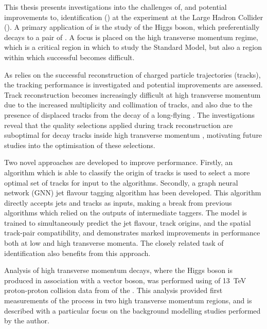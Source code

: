 
This thesis presents investigations into the challenges of, and potential improvements to, \bjet identification (\btagging) at the \ATLAS experiment at the Large Hadron Collider (\LHC).
A primary application of \btagging is the study of the Higgs boson, which preferentially decays to a pair of \bquarks.
A focus is placed on the high transverse momentum regime, which is a critical region in which to study the Standard Model, but also a region within which successful \btagging becomes difficult.

As \btagging relies on the successful reconstruction of charged particle trajectories (tracks), the tracking performance is investigated and potential improvements are assessed.
Track reconstruction becomes increasingly difficult at high transverse momentum due to the increased multiplicity and collimation of tracks, and also due to the presence of displaced tracks from the decay of a long-flying \bhadron.
The investigations reveal that the quality selections applied during track reconstruction are suboptimal for \bhadron decay tracks inside high transverse momentum \bjets, motivating future studies into the optimisation of these selections.

Two novel approaches are developed to improve \btagging performance.
Firstly, an algorithm which is able to classify the origin of tracks is used to select a more optimal set of tracks for input to the \btagging algorithms.
Secondly, a graph neural network (GNN) jet flavour tagging algorithm has been developed.
This algorithm directly accepts jets and tracks as inputs, making a break from previous algorithms which relied on the outputs of intermediate taggers.
The model is trained to simultaneously predict the jet flavour, track origins, and the spatial track-pair compatibility, and demonstrates marked improvements in \btagging performance both at low and high transverse momenta.
The closely related task of \cjet identification also benefits from this approach.

Analysis of high transverse momentum \Hbb decays, where the Higgs boson is produced in association with a vector boson, was performed using \intlumi of \SI{13}{\TeV} proton-proton collision data from \runtwo of the \LHC.
This analysis provided first measurements of the \VHbb process in two high transverse momentum regions, and is described with a particular focus on the background modelling studies performed by the author.